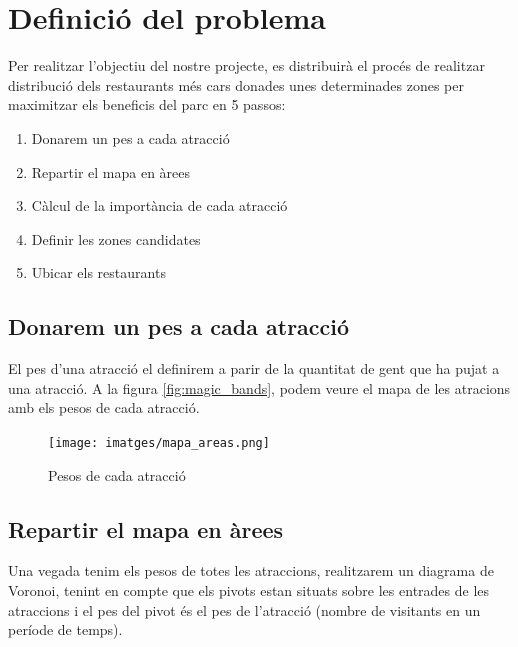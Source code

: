 \documentclass[12pt]{article}
\begin{document}
\clearpage
\section{Definició del problema}
Per realitzar l'objectiu del nostre projecte, es distribuirà el procés de realitzar distribució dels restaurants més cars donades unes determinades zones per maximitzar els beneficis del parc en 5 passos:
\renewcommand\labelitemii{$\square$}
\begin{enumerate}
	\item Donarem un pes a cada atracció
	\item Repartir el mapa en àrees
	\item Càlcul de la importància de cada atracció
	\item Definir les zones candidates
	\item Ubicar els restaurants
\end{enumerate}

\subsection{Donarem un pes a cada atracció}
El pes d'una atracció el definirem a parir de la quantitat de gent que ha pujat a una atracció. A la figura \ref{fig:magic_bands}, podem veure el mapa de les atracions amb els pesos de cada atracció.

\begin{figure}[h!]
	\centering
	\texttt{[image: imatges/mapa\_areas.png]}\par\vspace{1cm}
	\caption{Pesos de cada atracció}
	\label{fig:mapa_areas}
\end{figure}

\subsection{Repartir el mapa en àrees}
Una vegada tenim els pesos de totes les atraccions, realitzarem un diagrama de Voronoi, tenint en compte que els pivots estan situats sobre les entrades de les atraccions i el pes del pivot és el pes de l'atracció (nombre de visitants en un període de temps).
		
\end{document}

